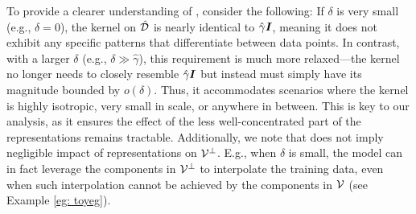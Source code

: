 \begin{remark}
{To provide a clearer understanding of \isotropy{}, consider the following: If $\delta$ is very small (e.g., $\delta = 0$), the kernel on $\hat{{\mathcal{D}}}$ is nearly identical to $\hat{\gamma}{\bm{I}}$, {meaning it does not exhibit any specific patterns that differentiate between data points.} 
In contrast, with a larger $\delta$ (e.g., $\delta \gg \hat{\gamma}$), this requirement is much more relaxed—the kernel  no longer needs to closely resemble $\hat{\gamma}{\bm{I}}$ but instead must simply have its magnitude bounded by $o(\delta)$. Thus, it accommodates scenarios where the kernel is highly isotropic, very small in scale, or anywhere in between. This is key to our analysis, as it ensures the effect of the less well-concentrated part of the representations remains tractable. Additionally, we note that \smallin{} does not imply negligible impact of representations on ${\mathcal{V}}^\perp$. E.g., when $\delta$ is small, the model can in fact leverage the components in ${\mathcal{V}}^\perp$ to interpolate the training data,  even when such interpolation cannot be achieved by the components in ${\mathcal{V}}$ (see Example \ref{eg: toyeg}).}
\end{remark}


